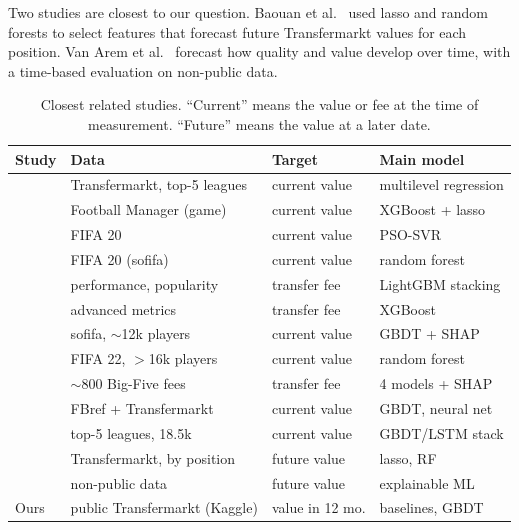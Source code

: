 \documentclass[conference]{IEEEtran}
\begin{document}
Two studies are closest to our question. Baouan et al.~\cite{baouan2025what} used lasso and random forests to select features that forecast future Transfermarkt values for each position. Van Arem et al.~\cite{vanarem2025forecasting} forecast how quality and value develop over time, with a time-based evaluation on non-public data.

\begin{table}[t]
\centering
\caption{Closest related studies. ``Current'' means the value or fee at the time of measurement. ``Future'' means the value at a later date.}
\label{tab:related}
\footnotesize
\setlength{\tabcolsep}{2.3pt}
\begin{tabular}{@{}llll@{}}
\toprule
Study & Data & Target & Main model \\
\midrule
\cite{mueller2017beyond} & Transfermarkt, top-5 leagues & current value & multilevel regression \\
\cite{yigit2020xgboost} & Football Manager (game) & current value & XGBoost + lasso \\
\cite{behravan2021novel} & FIFA 20 & current value & PSO-SVR \\
\cite{alasadi2022predict} & FIFA 20 (sofifa) & current value & random forest \\
\cite{aydemir2022ensembling} & performance, popularity & transfer fee & LightGBM stacking \\
\cite{mchale2023estimating} & advanced metrics & transfer fee & XGBoost \\
\cite{huang2023explainable} & sofifa, $\sim$12k players & current value & GBDT + SHAP \\
\cite{tamim2025machine} & FIFA 22, $>$16k players & current value & random forest \\
\cite{li2026interpretable} & $\sim$800 Big-Five fees & transfer fee & 4 models + SHAP \\
\cite{fotache2026machine} & FBref + Transfermarkt & current value & GBDT, neural net \\
\cite{wang2026predicting} & top-5 leagues, 18.5k & current value & GBDT/LSTM stack \\
\cite{baouan2025what} & Transfermarkt, by position & future value & lasso, RF \\
\cite{vanarem2025forecasting} & non-public data & future value & explainable ML \\
\midrule
Ours & public Transfermarkt (Kaggle) & value in 12 mo. & baselines, GBDT \\
\bottomrule
\end{tabular}
\end{table}
\end{document}
